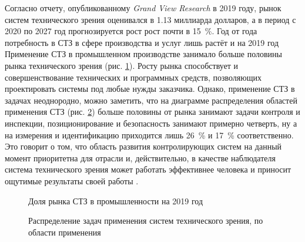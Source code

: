 Согласно отчету, опубликованному \textit{Grand View Research} в 2019 году, рынок систем технического зрения оценивался в 1.13 миллиарда долларов, а в период с 2020 по 2027 год прогнозируется рост рост почти в 15~\%. Год от года потребность в СТЗ в сфере производства и услуг лишь растёт и на 2019 год Применение СТЗ в промышленном производстве занимало больше половины рынка технического зрения (рис. \cref{fig:3d-market3}). Росту рынка способствует и совершенствование технических и программных средств, позволяющих проектировать системы под любые нужды заказчика. Однако, применение СТЗ в задачах неоднородно, можно заметить, что на диаграмме распределения областей применения СТЗ (рис. \cref{fig:3d-vis-market}) больше половины от рынка занимают задачи контроля и инспекции, позиционирование и безопасность занимают примерно четверть, ну а на измерения и идентификацию приходится лишь 26~\% и 17~\% соответственно. Это говорит о том, что область развития контролирующих систем на данный момент приоритетна для отрасли и, действительно, в качестве наблюдателя система технического зрения может работать эффективнее человека и приносит ощутимые результаты своей работы \cite{3d-vision}.

\begin{figure}[ht]
	\caption{Доля рынка СТЗ в промышленности на 2019 год}\label{fig:3d-market3}
\end{figure}

\begin{figure}[ht]
	\caption{Распределение задач применения систем технического зрения, по области применения}\label{fig:3d-vis-market}
\end{figure}

